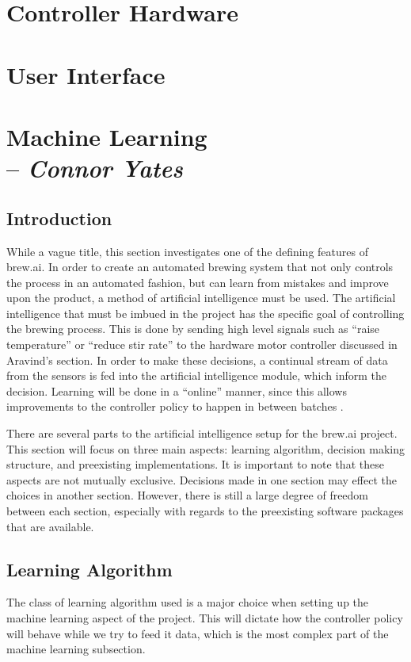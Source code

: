 \section{Controller Hardware}

\section{User Interface}

\section{Machine Learning \\ -- \textbf{\textit{Connor Yates}}}
\subsection{Introduction}
While a vague title, this section investigates one of the defining features of brew.ai.
In order to create an automated brewing system that not only controls the process in an automated fashion, but can learn from mistakes and improve upon the product, a method of artificial intelligence must be used.
The artificial intelligence that must be imbued in the project has the specific goal of controlling the brewing process.
This is done by sending high level signals such as ``raise temperature'' or ``reduce stir rate'' to the hardware motor controller discussed in Aravind's section.
In order to make these decisions, a continual stream of data from the sensors is fed into the artificial intelligence module, which inform the decision.
Learning will be done in a ``online'' manner, since this allows improvements to the controller policy to happen in between batches \cite{RussellNorvig}.

There are several parts to the artificial intelligence setup for the brew.ai project.
This section will focus on three main aspects: learning algorithm, decision making structure, and preexisting implementations.
It is important to note that these aspects are not mutually exclusive. 
Decisions made in one section may effect the choices in another section.
However, there is still a large degree of freedom between each section, especially with regards to the preexisting software packages that are available.

\subsection{Learning Algorithm}
The class of learning algorithm used is a major choice when setting up the machine learning aspect of the project.
This will dictate how the controller policy will behave while we try to feed it data, which is the most complex part of the machine learning subsection.
